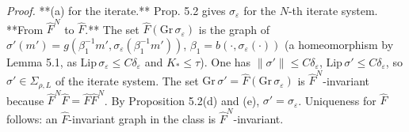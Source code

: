 \documentclass[11pt,a4paper]{article}
\theoremstyle{plain}
\theoremstyle{definition}
\theoremstyle{remark}
\numberwithin{equation}{section}
\numberwithin{figure}{section}
\begin{document}
\textit{Proof.} **(a) for the iterate.** Prop. 5.2 gives $\sigma_\varepsilon$ for the $N$-th iterate system. **From $\widehat F^N$ to $\widehat F$.** The set $\widehat F(\mathrm{Gr}\,\sigma_\varepsilon)$ is the graph of $\sigma'(m')=g(\beta_1^{-1}m',\sigma_\varepsilon(\beta_1^{-1}m'))$, $\beta_1=b(\cdot,\sigma_\varepsilon(\cdot))$ (a homeomorphism by Lemma 5.1, as $\mathrm{Lip}\,\sigma_\varepsilon\le C\delta_\varepsilon$ and $K_*\le\tau$). One has $\|\sigma'\|\le C\delta_\varepsilon$, $\mathrm{Lip}\,\sigma'\le C\delta_\varepsilon$, so $\sigma'\in\Sigma_{\rho,L}$ of the iterate system. The set $\mathrm{Gr}\,\sigma'=\widehat F(\mathrm{Gr}\,\sigma_\varepsilon)$ is $\widehat F^N$-invariant because $\widehat F^N\widehat F=\widehat F\widehat F^N$. By Proposition 5.2(d) and (e), $\sigma'=\sigma_\varepsilon$. Uniqueness for $\widehat F$ follows: an $\widehat F$-invariant graph in the class is $\widehat F^N$-invariant.
\end{document}
